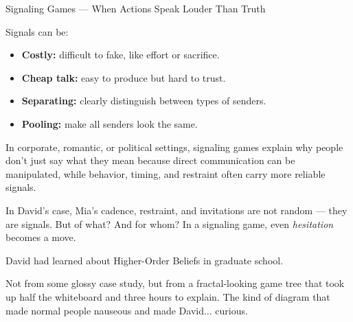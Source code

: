 \begin{TechnicalSidebar}{Signaling Games --- When Actions Speak Louder Than Truth}
    \medskip
    
    Signals can be:

    \medskip

    \begin{itemize}
      \item \textbf{Costly:} difficult to fake, like effort or sacrifice.
      \item \textbf{Cheap talk:} easy to produce but hard to trust.
      \item \textbf{Separating:} clearly distinguish between types of senders.
      \item \textbf{Pooling:} make all senders look the same.
    \end{itemize}
    
    \medskip
    
    In corporate, romantic, or political settings, signaling games explain why people don’t just say 
    what they mean because direct communication can be manipulated, while behavior, timing, and restraint 
    often carry more reliable signals.

    \medskip
    
    
    In David’s case, Mia’s cadence, restraint, and invitations are not random — 
    they are signals. But of what? And for whom? 
    In a signaling game, even \emph{hesitation} becomes a move.  
    
\end{TechnicalSidebar}

\medskip

David had learned about Higher-Order Beliefs in graduate school.

Not from some glossy case study, but from a fractal-looking game tree that took up half 
the whiteboard and three hours to explain.  The kind of diagram that made normal people 
nauseous and made David... curious.

\medskip

